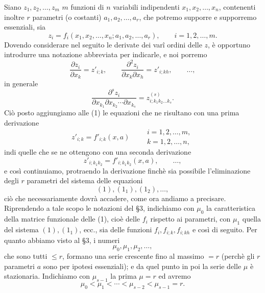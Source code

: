 \documentclass[11pt]{book}
\begin{document}
Siano $z_1,z_2,\ldots,z_m$ $m$ funzioni di $n$ variabili indipendenti $x_1,x_2,\ldots,x_n$, contenenti inoltre $r$ parametri (o costanti) $a_1,a_2,\ldots,a_r$, che potremo supporre e supporremo essenziali, sia
\begin{equation*}\tag{1}
 z_i=f_i(x_1,x_2,\ldots,x_n; a_1,a_2,\ldots,a_r),
 \qquad i=1,2,\ldots,m.
\end{equation*}
Dovendo considerare nel seguito le derivate dei varî ordini delle $z$, è opportuno introdurre una notazione abbreviata per indicarle, e noi porremo
\[
 \frac{\partial z_i}{\partial x_k}=z'_{i;k},
 \qquad
 \frac{\partial^2 z_i}{\partial x_k\partial x_h}=z'_{i;kh},
 \qquad \ldots,
\]
in generale
\[
 \frac{\partial^s z_i}{\partial x_{k_1}\partial x_{k_2}\cdots\partial x_{k_s}}
   =z^{(s)}_{i;k_1k_2\ldots k_s}.
\]
Ciò posto aggiungiamo alle (1) le equazioni che ne risultano con una prima derivazione
\begin{equation*}\tag{$1_1$}
 z'_{i;k}=f'_{i;k}(x,a)
 \qquad
 \begin{gathered}
 i=1,2,\ldots,m,\\
 k=1,2,\ldots,n,
 \end{gathered}
\end{equation*}
indi quelle che se ne ottengono con una seconda derivazione
\begin{equation*}\tag{$1_2$}
 z'_{i;k_1k_2}=f'_{i;k_1k_2}(x,a),
 \qquad \ldots,
\end{equation*}
e così continuiamo, protraendo la derivazione finchè sia possibile l'eliminazione degli $r$ parametri del sistema delle equazioni
\[
 (1),(1_1),(1_2),\ldots,
\]
ciò che necessariamente dovrà accadere, come ora andiamo a precisare. Riprendendo a tale scopo le notazioni del \S{}3, indichiamo con $\mu_0$ la caratteristica della matrice funzionale delle (1), cioè delle $f_i$ rispetto ai parametri, con $\mu_1$ quella del sistema $(1),(1_1)$, ecc., sia delle funzioni $f_i,f_{i;k},f_{i;kh}$ e così di seguito. Per quanto abbiamo visto al \S{}3, i numeri
\[
 \mu_0,\mu_1,\mu_2,\ldots,
\]
che sono tutti $\le r$, formano una serie crescente fino al massimo $=r$ (perchè gli $r$ parametri $a$ sono per ipotesi essenziali); e da quel punto in poi la serie delle $\mu$ è stazionaria. Indichiamo con $\mu_{s-1}$ la prima $\mu=r$ ed avremo
\[
 \mu_0<\mu_1<\cdots<\mu_{s-2}<\mu_{s-1}=r.
\]
\end{document}
